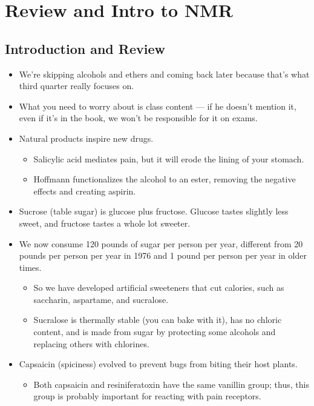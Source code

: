 \documentclass[../notes.tex]{subfiles}
\begin{document}
\chapter{Review and Intro to NMR}
\section{Introduction and Review}
\begin{itemize}
    \item {}We're skipping alcohols and ethers and coming back later because that's what third quarter really focuses on.
    \item What you need to worry about is class content --- if he doesn't mention it, even if it's in the book, we won't be responsible for it on exams.
    \item Natural products inspire new drugs.
    \begin{itemize}
        \item Salicylic acid mediates pain, but it will erode the lining of your stomach.
        \item Hoffmann functionalizes the alcohol to an ester, removing the negative effects and creating aspirin.
    \end{itemize}
    \item Sucrose (table sugar) is glucose plus fructose. Glucose tastes slightly less sweet, and fructose tastes a whole lot sweeter.
    \item We now consume 120 pounds of sugar per person per year, different from 20 pounds per person per year in 1976 and 1 pound per person per year in older times.
    \begin{itemize}
        \item So we have developed artificial sweeteners that cut calories, such as saccharin, aspartame, and sucralose.
        \item Sucralose is thermally stable (you can bake with it), has no chloric content, and is made from sugar by protecting some alcohols and replacing others with chlorines.
    \end{itemize}
    \item Capsaicin (spiciness) evolved to prevent bugs from biting their host plants.
    \begin{itemize}
        \item Both capsaicin and resiniferatoxin have the same vanillin group; thus, this group is probably important for reacting with pain receptors.
    \end{itemize}

\end{itemize}
\end{document}
